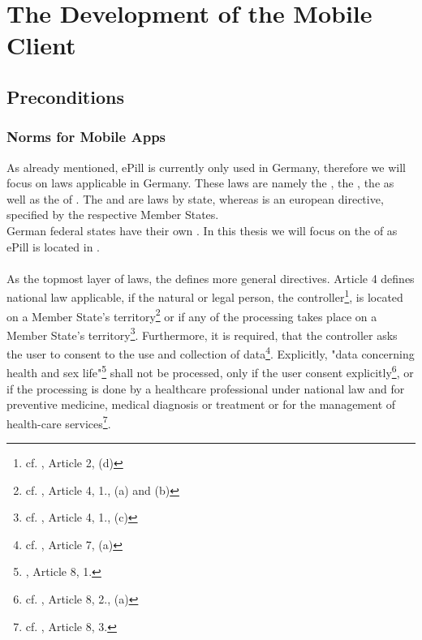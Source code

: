 \section{The Development of the Mobile Client}
\subsection{Preconditions}
\label{subsec:Preconditions}
\subsubsection{Norms for Mobile Apps}
\label{subsubsec:Norms}
As already mentioned, ePill is currently only used in Germany, therefore we will focus on laws applicable in Germany. These laws are namely the \TKGns, the \TMGns, the \REG as well as the \DPA of \NRWns. The \TKG and \TMG are laws by state, whereas \REG is an european directive, specified by the respective Member States. 
\\
German federal states have their own \DPAsns. In this thesis we will focus on the \DPA of \NRW as ePill is located in \NRWns.
\\
\\
As the topmost layer of laws, the \REG defines more general directives. Article 4 defines national law applicable, if the natural or legal person, the controller\footnote{cf. \cite{TheEuropeanParliamentandtheCounciloftheEuropeanUnion.24.10.1995}, Article 2, (d)}, is located on a Member State's territory\footnote{cf. \cite{TheEuropeanParliamentandtheCounciloftheEuropeanUnion.24.10.1995}, Article 4, 1., (a) and (b)} or if any of the processing takes place on a Member State's territory\footnote{cf. \cite{TheEuropeanParliamentandtheCounciloftheEuropeanUnion.24.10.1995}, Article 4, 1., (c)}. Furthermore, it is required, that the controller asks the user to consent to the use and collection of data\footnote{cf. \cite{TheEuropeanParliamentandtheCounciloftheEuropeanUnion.24.10.1995}, Article 7, (a)}. Explicitly, "data concerning health and sex life"\footnote{\cite{TheEuropeanParliamentandtheCounciloftheEuropeanUnion.24.10.1995}, Article 8, 1.} shall not be processed, only if the user consent explicitly\footnote{cf. \cite{TheEuropeanParliamentandtheCounciloftheEuropeanUnion.24.10.1995}, Article 8, 2., (a)}, or if the processing is done by a healthcare professional under national law and for preventive medicine, medical diagnosis or treatment or for the management of health-care services\footnote{cf. \cite{TheEuropeanParliamentandtheCounciloftheEuropeanUnion.24.10.1995}, Article 8, 3.}. 
